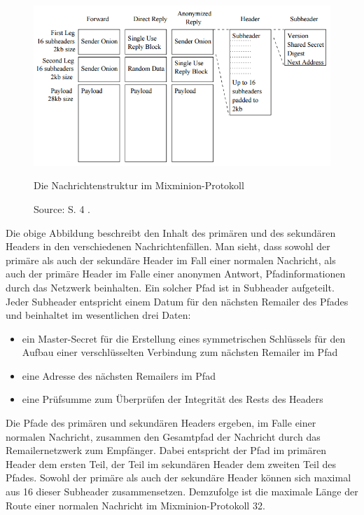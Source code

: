 \begin{figure}
	\begin{center}
		\def\svgwidth{0.9 \linewidth}
		\includegraphics[width = 0.9 \linewidth]{bilder/mixminion_structure.png}
		\caption{Die Nachrichtenstruktur im Mixminion-Protokoll}
		\caption*{\hfill Source: S. 4 \cite{mixminion}.}
	\end{center}
\end{figure}

Die obige Abbildung beschreibt den Inhalt des primären und des sekundären Headers in den verschiedenen Nachrichtenfällen.
Man sieht, dass sowohl der primäre als auch der sekundäre Header im Fall einer normalen Nachricht, als auch der primäre Header im Falle einer anonymen Antwort, Pfadinformationen durch das Netzwerk beinhalten.
Ein solcher Pfad ist in Subheader aufgeteilt. Jeder Subheader entspricht einem Datum für den nächsten Remailer des Pfades und beinhaltet im wesentlichen drei Daten:
\begin{itemize}
\item ein Master-Secret für die Erstellung eines symmetrischen Schlüssels für den Aufbau einer verschlüsselten Verbindung zum nächsten Remailer im Pfad
\item eine Adresse des nächsten Remailers im Pfad
\item eine Prüfsumme zum Überprüfen der Integrität des Rests des Headers
\end{itemize}
Die Pfade des primären und sekundären Headers ergeben, im Falle einer normalen Nachricht, zusammen den Gesamtpfad der Nachricht durch das Remailernetzwerk zum Empfänger. Dabei entspricht der Pfad im primären Header dem ersten Teil, der Teil im sekundären Header dem zweiten Teil des Pfades.
Sowohl der primäre als auch der sekundäre Header können sich maximal aus 16 dieser Subheader zusammensetzen. Demzufolge ist die maximale Länge der Route einer normalen Nachricht im Mixminion-Protokoll 32.

